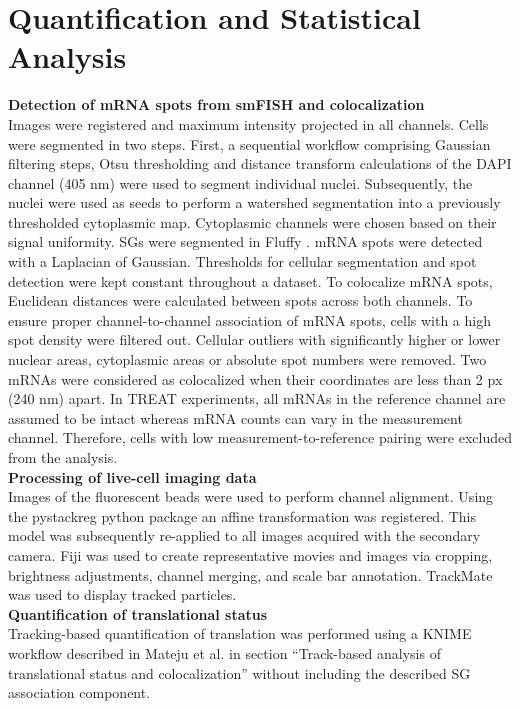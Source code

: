 \section{Quantification and Statistical Analysis}

\textbf{Detection of mRNA spots from smFISH and colocalization} \\
Images were registered and maximum intensity projected in all channels.
Cells were segmented in two steps.
First, a sequential workflow comprising Gaussian filtering steps, Otsu thresholding \cite{otsu_threshold_1979} and distance transform calculations of the DAPI channel (405 nm) were used to segment individual nuclei.
Subsequently, the nuclei were used as seeds to perform a watershed segmentation into a previously thresholded cytoplasmic map.
Cytoplasmic channels were chosen based on their signal uniformity.
SGs were segmented in Fluffy \cite{eichenberger_fluffy_2020}.
mRNA spots were detected with a Laplacian of Gaussian.
Thresholds for cellular segmentation and spot detection were kept constant throughout a dataset.
To colocalize mRNA spots, Euclidean distances were calculated between spots across both channels.
To ensure proper channel-to-channel association of mRNA spots, cells with a high spot density were filtered out.
Cellular outliers with significantly higher or lower nuclear areas, cytoplasmic areas or absolute spot numbers were removed.
Two mRNAs were considered as colocalized when their coordinates are less than 2 px (240 nm) apart.
In TREAT experiments, all mRNAs in the reference channel are assumed to be intact whereas mRNA counts can vary in the measurement channel.
Therefore, cells with low measurement-to-reference pairing were excluded from the analysis.
\\

\textbf{Processing of live-cell imaging data} \\
Images of the fluorescent beads were used to perform channel alignment.
Using the pystackreg python package \cite{thevenaz_pyramid_1998} an affine transformation was registered.
This model was subsequently re-applied to all images acquired with the secondary camera.
Fiji \cite{schindelin_fiji_2012} was used to create representative movies and images via cropping, brightness adjustments, channel merging, and scale bar annotation.
TrackMate \cite{tinevez_trackmate:_2017} was used to display tracked particles.
\\

\textbf{Quantification of translational status} \\
Tracking-based quantification of translation was performed using a KNIME \cite{berthold_knime_2009} workflow described
    in Mateju et al. \cite{mateju_single-molecule_2020} in section “Track-based analysis of translational status and colocalization” without including the described SG association component.
\\

